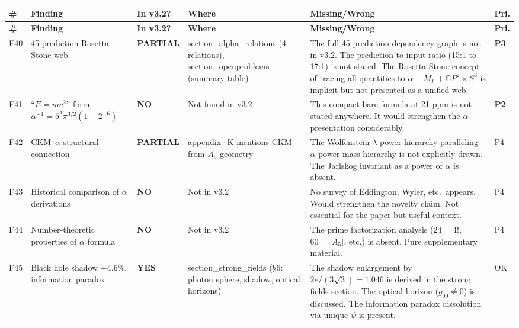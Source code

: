 \documentclass[11pt,a4paper]{article}
\newcommand{\YES}{\textcolor{yes}{\textbf{YES}}}
\newcommand{\PARTIAL}{\textcolor{partial}{\textbf{PARTIAL}}}
\newcommand{\NO}{\textcolor{no}{\textbf{NO}}}
\begin{document}
\begin{longtable}{|p{0.5cm}|p{3.5cm}|p{1.2cm}|p{3.5cm}|p{4.5cm}|p{1cm}|}
\hline
\textbf{\#} & \textbf{Finding} & \textbf{In v3.2?} & \textbf{Where} & \textbf{Missing/Wrong} & \textbf{Pri.} \\
\hline
\endfirsthead
\hline
\textbf{\#} & \textbf{Finding} & \textbf{In v3.2?} & \textbf{Where} & \textbf{Missing/Wrong} & \textbf{Pri.} \\
\hline
\endhead

F40 & 45-prediction Rosetta Stone web &
\PARTIAL &
section\_alpha\_relations (4 relations), section\_openproblems (summary table) &
The full 45-prediction dependency graph is not in v3.2. The prediction-to-input ratio (15:1 to 17:1) is not stated. The Rosetta Stone concept of tracing all quantities to $\alpha + M_P + \mathbb{C}P^2 \times S^3$ is implicit but not presented as a unified web. &
\textbf{P3} \\
\hline

F41 & ``$E=mc^2$'' form: $\alpha^{-1} = 5^2\pi^{3/2}(1-2^{-6})$ &
\NO &
Not found in v3.2 &
This compact bare formula at 21 ppm is not stated anywhere. It would strengthen the $\alpha$ presentation considerably. &
\textbf{P2} \\
\hline

F42 & CKM--$\alpha$ structural connection &
\PARTIAL &
appendix\_K mentions CKM from $A_5$ geometry &
The Wolfenstein $\lambda$-power hierarchy paralleling $\alpha$-power mass hierarchy is not explicitly drawn. The Jarlskog invariant as a power of $\alpha$ is absent. &
P4 \\
\hline

F43 & Historical comparison of $\alpha$ derivations &
\NO &
Not in v3.2 &
No survey of Eddington, Wyler, etc.\ appears. Would strengthen the novelty claim. Not essential for the paper but useful context. &
P4 \\
\hline

F44 & Number-theoretic properties of $\alpha$ formula &
\NO &
Not in v3.2 &
The prime factorization analysis ($24 = 4!$, $60 = |A_5|$, etc.) is absent. Pure supplementary material. &
P4 \\
\hline

F45 & Black hole shadow $+4.6\%$, information paradox &
\YES &
section\_strong\_fields (\S6: photon sphere, shadow, optical horizons) &
The shadow enlargement by $2e/(3\sqrt{3}) = 1.046$ is derived in the strong fields section. The optical horizon ($g_{00} \neq 0$) is discussed. The information paradox dissolution via unique $\psi$ is present. &
OK \\
\hline


\end{longtable}
\end{document}
